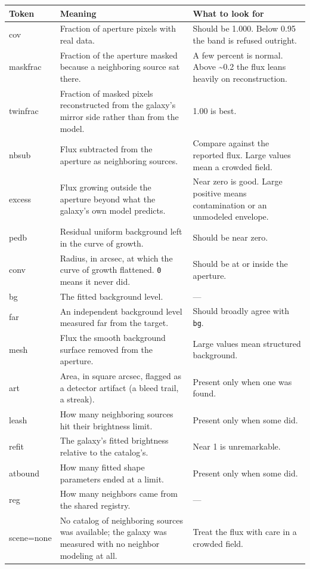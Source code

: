 \documentclass[11pt]{article}
\begin{document}
\begin{longtable}{T{2.6cm} L{5.4cm} L{6.4cm}}
\toprule
\textbf{\normalfont Token} & \textbf{Meaning} & \textbf{What to look for} \\
\midrule
\endhead
cov & Fraction of aperture pixels with real data. & Should be 1.000. Below
  0.95 the band is refused outright. \\[2pt]
maskfrac & Fraction of the aperture masked because a neighboring source
  sat there. & A few percent is normal. Above
  \textasciitilde0.2 the flux leans heavily on reconstruction. \\[2pt]
twinfrac & Fraction of masked pixels reconstructed from the galaxy's
  mirror side rather than from the model. & 1.00 is best. \\[2pt]
nbsub & Flux subtracted from the aperture as neighboring sources. &
  Compare against the reported flux. Large values mean a crowded
  field. \\[2pt]
excess & Flux growing outside the aperture beyond what the galaxy's own
  model predicts. & Near zero is good. Large positive means contamination
  or an unmodeled envelope. \\[2pt]
pedb & Residual uniform background left in the curve of growth. & Should
  be near zero. \\[2pt]
conv & Radius, in arcsec, at which the curve of growth flattened.
  \texttt{0} means it never did. & Should be at or inside the
  aperture. \\[2pt]
bg & The fitted background level. & --- \\[2pt]
far & An independent background level measured far from the target. &
  Should broadly agree with \texttt{bg}. \\[2pt]
mesh & Flux the smooth background surface removed from the aperture. &
  Large values mean structured background. \\[2pt]
art & Area, in square arcsec, flagged as a detector artifact (a bleed
  trail, a streak). & Present only when one was found. \\[2pt]
leash & How many neighboring sources hit their brightness limit. & Present
  only when some did. \\[2pt]
refit & The galaxy's fitted brightness relative to the catalog's. & Near 1
  is unremarkable. \\[2pt]
atbound & How many fitted shape parameters ended at a limit. & Present
  only when some did. \\[2pt]
reg & How many neighbors came from the shared registry. & --- \\[2pt]
scene=none & No catalog of neighboring sources was available; the galaxy
  was measured with no neighbor modeling at all. & Treat the flux with
  care in a crowded field. \\
\bottomrule
\end{longtable}
\end{document}
